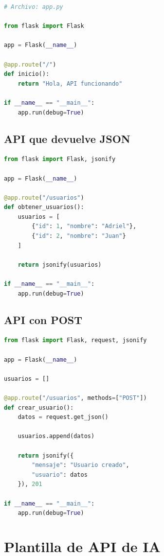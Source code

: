 \documentclass[12pt]{article}
\begin{document}
\begin{lstlisting}[language=Python]
# Archivo: app.py

from flask import Flask

app = Flask(__name__)

@app.route("/")
def inicio():
    return "Hola, API funcionando"

if __name__ == "__main__":
    app.run(debug=True)
\end{lstlisting}

\subsection{API que devuelve JSON}

\begin{lstlisting}[language=Python]
from flask import Flask, jsonify

app = Flask(__name__)

@app.route("/usuarios")
def obtener_usuarios():
    usuarios = [
        {"id": 1, "nombre": "Adriel"},
        {"id": 2, "nombre": "Juan"}
    ]

    return jsonify(usuarios)

if __name__ == "__main__":
    app.run(debug=True)
\end{lstlisting}

\subsection{API con POST}

\begin{lstlisting}[language=Python]
from flask import Flask, request, jsonify

app = Flask(__name__)

usuarios = []

@app.route("/usuarios", methods=["POST"])
def crear_usuario():
    datos = request.get_json()

    usuarios.append(datos)

    return jsonify({
        "mensaje": "Usuario creado",
        "usuario": datos
    }), 201

if __name__ == "__main__":
    app.run(debug=True)
\end{lstlisting}

\section{Plantilla de API de IA}
\end{document}
